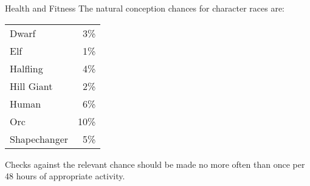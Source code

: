 \begin{Chapter}{Health and Fitness}
The natural conception chances for character races are:

\begin{tabularx}{\columnwidth}{lr}
Dwarf		& 3\% \\
Elf		& 1\% \\
Halfling	& 4\% \\ 
Hill Giant	& 2\% \\
Human		& 6\% \\
Orc		& 10\% \\
Shapechanger	& 5\% \\
\end{tabularx}

Checks against the relevant chance should be made no more often than
once per 48 hours of appropriate activity.
\end{Chapter}
